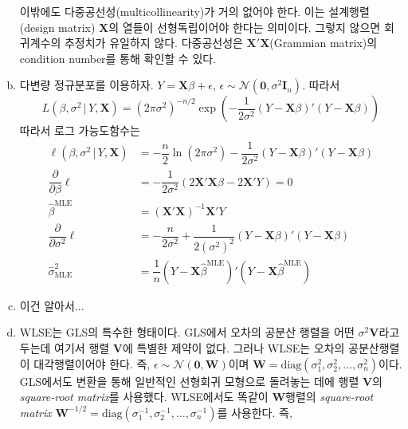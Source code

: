 \documentclass[answers]{exam}
\newcommand{\bs}{\boldsymbol}
\begin{document}
\begin{questions}
\begin{solution}
\begin{enumerate}[(a)]
        이밖에도 다중공선성(multicollinearity)가 거의 없어야 한다. 이는 설계행렬(design matrix) $\mathbf{X}$의 열들이 선형독립이어야 한다는 의미이다. 그렇지 않으면 회귀계수의 추정치가 유일하지 않다. 다중공선성은 $\mathbf{X}'\mathbf{X}$(Grammian matrix)의 condition number를 통해 확인할 수 있다.
        \item 다변량 정규분포를 이용하자. $Y=\mathbf{X}\beta+\epsilon$, $\epsilon\sim\mathcal{N}\left(\bs{0},\sigma^{2}\mathbf{I}_{n}\right)$. 따라서
        \begin{equation}
          L\left(\beta,\sigma^{2}\,|\,Y,\mathbf{X}\right) = \left(2\pi\sigma^{2}\right)^{-n/2}\exp\left(-\dfrac{1}{2\sigma^{2}}\left(Y-\mathbf{X}\beta\right)'\left(Y-\mathbf{X}\beta\right)\right)
        \end{equation}
        따라서 로그 가능도함수는
        \begin{align}
          \ell\left(\beta,\sigma^{2}\,|\,Y,\mathbf{X}\right) &= -\dfrac{n}{2}\ln\left(2\pi\sigma^{2}\right)-\dfrac{1}{2\sigma^{2}}\left(Y-\mathbf{X}\beta\right)'\left(Y-\mathbf{X}\beta\right)\\
          \dfrac{\partial}{\partial \beta}\ell &= -\dfrac{1}{2\sigma^{2}}\left(2\mathbf{X}'\mathbf{X}\beta-2\mathbf{X}'Y\right)=0\\
          \widehat{\beta}^{\text{MLE}} &= \left(\mathbf{X}'\mathbf{X}\right)^{-1}\mathbf{X}'Y\\
          \dfrac{\partial}{\partial \sigma^{2}}\ell &= -\dfrac{n}{2\sigma^{2}}+\dfrac{1}{2\left(\sigma^{2}\right)^{2}}\left(Y-\mathbf{X}\beta\right)'\left(Y-\mathbf{X}\beta\right)\\
          \widehat{\sigma}^{2}_{\text{MLE}} &= \dfrac{1}{n}\left(Y-\mathbf{X}\widehat{\beta}^{\text{MLE}}\right)'\left(Y-\mathbf{X}\widehat{\beta}^{\text{MLE}}\right)
        \end{align}
        \item 이건 알아서...
        \item WLSE는 GLS의 특수한 형태이다. GLS에서 오차의 공분산 행렬을 어떤 $\sigma^{2}\mathbf{V}$라고 두는데 여기서 행렬 $\mathbf{V}$에 특별한 제약이 없다. 그러나 WLSE는 오차의 공분산행렬이 대각행렬이어야 한다. 즉, $\epsilon\sim\mathcal{N}\left(\bs{0},\mathbf{W}\right)$이며 $\mathbf{W}=\mathrm{diag}\left(\sigma_{1}^{2},\sigma_{2}^{2},\ldots, \sigma_{n}^{2}\right)$이다. GLS에서도 변환을 통해 일반적인 선형회귀 모형으로 돌려놓는 데에 행렬 $\mathbf{V}$의 \emph{square-root matrix}를 사용했다. WLSE에서도 똑같이 $\mathbf{W}$행렬의 \emph{square-root matrix} $\mathbf{W}^{-1/2}=\mathrm{diag}\left(\sigma_{1}^{-1},\sigma_{2}^{-1},\ldots,\sigma_{n}^{-1}\right)$를 사용한다. 즉,

\end{enumerate}
\end{solution}
\end{questions}
\end{document}
